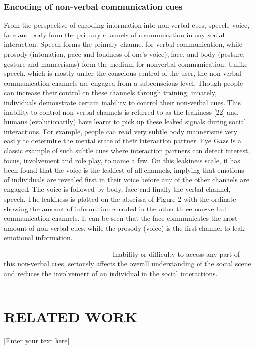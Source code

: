 \documentclass[oneside,11pt]{memoir}
\begin{document}
\subsection{Encoding of non-verbal communication cues}
From the perspective of encoding information into non-verbal cues, speech, voice, face and body form the primary channels of communication in any social interaction. Speech forms the primary channel for verbal communication, while prosody (intonation, pace and loudness of one’s voice), face, and body (posture, gesture and mannerisms) form the medium for nonverbal communication. Unlike speech, which is mostly under the conscious control of the user, the non-verbal communication channels are engaged from a subconscious level. Though people can increase their control on these channels through training, innately, individuals demonstrate certain inability to control their non-verbal cues. This inability to control non-verbal channels is referred to as the leakiness [22] and humans (evolutionarily) have learnt to pick up these leaked signals during social interactions. For example, people can read very subtle body mannerisms very easily to determine the mental state of their interaction partner. Eye Gaze is a classic example of such subtle cues where interaction partners can detect interest, focus, involvement and role play, to name a few.  On this leakiness scale, it has been found that the voice is the leakiest of all channels, implying that emotions of individuals are revealed first in their voice before any of the other channels are engaged. The voice is followed by body, face and finally the verbal channel, speech. The leakiness is plotted on the abscissa of Figure 2 with the ordinate showing the amount of information encoded in the other three non-verbal communication channels. It can be seen that the face communicates the most amount of non-verbal cues, while the prosody (voice) is the first channel to leak emotional information.

-----------------------------------------------
Inability or difficulty to access any part of this non-verbal cues, seriously affects the overall understanding of the social scene and reduces the involvement of an individual in the social interactions.
---------------------------------------------


\chapter{RELATED WORK} 

\DoubleSpacing
\setlength{\parindent}{.5in}
[Enter your text here]
\end{document}
